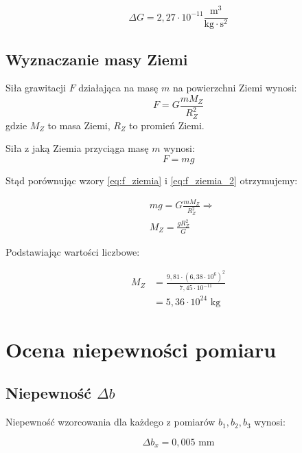 \documentclass[a4paper,12pt]{article}
\begin{document}
\begin{equation}
\Delta G = 2{,}27 \cdot 10^{-11} \frac{\text{m}^3}{\text{kg} \cdot \text{s}^2}
\end{equation}

\subsection{Wyznaczanie masy Ziemi}


Siła grawitacji $F$ działająca na masę $m$ na powierzchni Ziemi wynosi:
\begin{equation}
    \label{eq:f_ziemia}
F = G \frac{mM_Z}{R_Z^2}
\end{equation}
gdzie $M_Z$ to masa Ziemi, $R_Z$ to promień Ziemi.

Siła z jaką Ziemia przyciąga masę $m$ wynosi:
\begin{equation}
    \label{eq:f_ziemia_2}
F = mg
\end{equation}

Stąd porównując wzory \eqref{eq:f_ziemia} i \eqref{eq:f_ziemia_2} otrzymujemy:

\begin{align*}
    & mg = G \frac{mM_Z}{R_Z^2} \Rightarrow \\
    & M_Z = \frac{gR_Z^2}{G}
\end{align*}

Podstawiając wartości liczbowe:

\begin{align*}
    M_Z &= \frac{9{,}81 \cdot (6{,}38 \cdot 10^6)^2}{7{,}45 \cdot 10^{-11}} \\
    &= 5{,}36 \cdot 10^{24} \text{ kg}
\end{align*}










\section{Ocena niepewności pomiaru}

\subsection{Niepewność $\Delta b$}

Niepewność wzorcowania dla każdego z pomiarów $b_1, b_2, b_3$ wynosi:

$$
\Delta b_x = 0,005 \text{ mm}
$$
\end{document}
